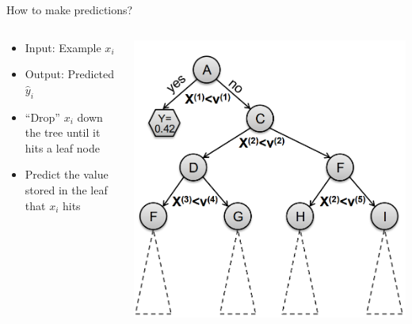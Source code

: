 \begin{frame}{How to make predictions?}
    \begin{columns}
        \begin{column}{0.5\textwidth}
            \begin{itemize}
                \item Input: Example $x_i$
                \item Output: Predicted $\hat{y}_i$
                \item “Drop” $x_i$ down the tree until it hits a leaf node
                \item Predict the value stored in the leaf that $x_i$ hits
            \end{itemize}
        \end{column}
        \begin{column}{0.5\textwidth}
            \includegraphics[width=\linewidth]{images/decision-trees/decision-trees-5.png}
        \end{column}
    \end{columns}
\end{frame}

